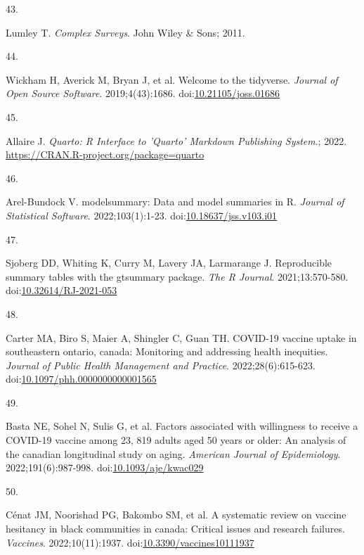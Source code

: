 \documentclass[
  letterpaper,
  DIV=11,
  numbers=noendperiod]{scrartcl}
\newlength{\cslhangindent}
\newlength{\csllabelwidth}
\newlength{\cslentryspacingunit} %
\newenvironment{CSLReferences}[2] %
 {%
  \setlength{\parindent}{0pt}
  \ifodd #1
  \let\oldpar\par
  \def\par{\hangindent=\cslhangindent\oldpar}
  \fi
  \setlength{\parskip}{#2\cslentryspacingunit}
 }%
 {}
\newcommand{\CSLLeftMargin}[1]{\parbox[t]{\csllabelwidth}{#1}}
\newcommand{\CSLRightInline}[1]{\parbox[t]{\linewidth - \csllabelwidth}{#1}\break}
\begin{document}
\begin{CSLReferences}{0}{0}
\leavevmode{}%
\CSLLeftMargin{43. }%
\CSLRightInline{Lumley T. \emph{Complex Surveys}. John Wiley \& Sons;
2011.}

\leavevmode{}%
\CSLLeftMargin{44. }%
\CSLRightInline{Wickham H, Averick M, Bryan J, et al. Welcome to the
{tidyverse}. \emph{Journal of Open Source Software}. 2019;4(43):1686.
doi:\href{https://doi.org/10.21105/joss.01686}{10.21105/joss.01686}}

\leavevmode{}%
\CSLLeftMargin{45. }%
\CSLRightInline{Allaire J. \emph{Quarto: R Interface to 'Quarto'
Markdown Publishing System}.; 2022.
\url{https://CRAN.R-project.org/package=quarto}}

\leavevmode{}%
\CSLLeftMargin{46. }%
\CSLRightInline{Arel-Bundock V. {modelsummary}: Data and model summaries
in {R}. \emph{Journal of Statistical Software}. 2022;103(1):1-23.
doi:\href{https://doi.org/10.18637/jss.v103.i01}{10.18637/jss.v103.i01}}

\leavevmode{}%
\CSLLeftMargin{47. }%
\CSLRightInline{Sjoberg DD, Whiting K, Curry M, Lavery JA, Larmarange J.
Reproducible summary tables with the gtsummary package. \emph{{The R
Journal}}. 2021;13:570-580.
doi:\href{https://doi.org/10.32614/RJ-2021-053}{10.32614/RJ-2021-053}}

\leavevmode{}%
\CSLLeftMargin{48. }%
\CSLRightInline{Carter MA, Biro S, Maier A, Shingler C, Guan TH.
{COVID}-19 vaccine uptake in southeastern ontario, canada: Monitoring
and addressing health inequities. \emph{Journal of Public Health
Management and Practice}. 2022;28(6):615-623.
doi:\href{https://doi.org/10.1097/phh.0000000000001565}{10.1097/phh.0000000000001565}}

\leavevmode{}%
\CSLLeftMargin{49. }%
\CSLRightInline{Basta NE, Sohel N, Sulis G, et al. Factors associated
with willingness to receive a {COVID}-19 vaccine among 23, 819 adults
aged 50 years or older: An analysis of the canadian longitudinal study
on aging. \emph{American Journal of Epidemiology}. 2022;191(6):987-998.
doi:\href{https://doi.org/10.1093/aje/kwac029}{10.1093/aje/kwac029}}

\leavevmode{}%
\CSLLeftMargin{50. }%
\CSLRightInline{Cénat JM, Noorishad PG, Bakombo SM, et al. A systematic
review on vaccine hesitancy in black communities in canada: Critical
issues and research failures. \emph{Vaccines}. 2022;10(11):1937.
doi:\href{https://doi.org/10.3390/vaccines10111937}{10.3390/vaccines10111937}}


\end{CSLReferences}
\end{document}
